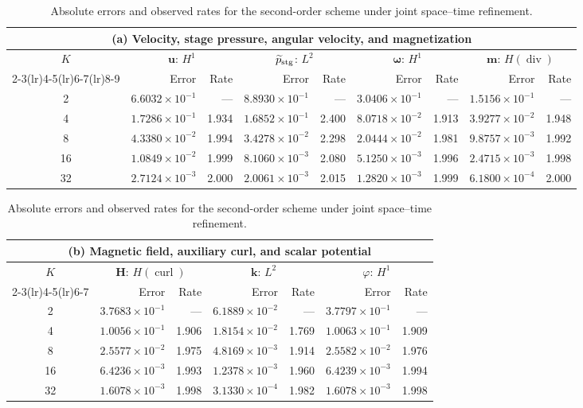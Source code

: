 \documentclass[11pt,a4paper]{article}
\newcommand{\bs}{\boldsymbol}
\DeclareMathOperator{\curl}{curl}
\DeclareMathOperator{\ddiv}{div}
\newcommand{\Div}{\ddiv}
\newcommand{\pp}{\widetilde p}
\theoremstyle{definition}
\numberwithin{equation}{section}
\begin{document}
\begin{table}[H]
\centering
\caption{Absolute errors and observed rates for the second-order scheme under joint space--time refinement.}
\label{tab:second-order-absolute-errors}
\begingroup
\small
\setlength{\tabcolsep}{3.5pt}
\renewcommand{\arraystretch}{1.10}
\begin{tabular}{@{}c*{8}{r}@{}}
\toprule
\multicolumn{9}{c}{(a) Velocity, stage pressure, angular velocity, and magnetization}\\
\midrule
$K$ & \multicolumn{2}{c}{$\bs u$: $H^1$} & \multicolumn{2}{c}{$\pp_{\rm stg}$: $L^2$} & \multicolumn{2}{c}{$\bs\omega$: $H^1$} & \multicolumn{2}{c}{$\bs m$: $H(\Div)$}\\
\cmidrule(lr){2-3}\cmidrule(lr){4-5}\cmidrule(lr){6-7}\cmidrule(lr){8-9}
 & Error & Rate & Error & Rate & Error & Rate & Error & Rate\\
\midrule
2 & $6.6032\!\times\!10^{-1}$ & --- & $8.8930\!\times\!10^{-1}$ & --- & $3.0406\!\times\!10^{-1}$ & --- & $1.5156\!\times\!10^{-1}$ & ---\\
4 & $1.7286\!\times\!10^{-1}$ & 1.934 & $1.6852\!\times\!10^{-1}$ & 2.400 & $8.0718\!\times\!10^{-2}$ & 1.913 & $3.9277\!\times\!10^{-2}$ & 1.948\\
8 & $4.3380\!\times\!10^{-2}$ & 1.994 & $3.4278\!\times\!10^{-2}$ & 2.298 & $2.0444\!\times\!10^{-2}$ & 1.981 & $9.8757\!\times\!10^{-3}$ & 1.992\\
16 & $1.0849\!\times\!10^{-2}$ & 1.999 & $8.1060\!\times\!10^{-3}$ & 2.080 & $5.1250\!\times\!10^{-3}$ & 1.996 & $2.4715\!\times\!10^{-3}$ & 1.998\\
32 & $2.7124\!\times\!10^{-3}$ & 2.000 & $2.0061\!\times\!10^{-3}$ & 2.015 & $1.2820\!\times\!10^{-3}$ & 1.999 & $6.1800\!\times\!10^{-4}$ & 2.000\\
\bottomrule
\end{tabular}
\par\medskip
\begin{tabular}{@{}c*{6}{r}@{}}
\toprule
\multicolumn{7}{c}{(b) Magnetic field, auxiliary curl, and scalar potential}\\
\midrule
$K$ & \multicolumn{2}{c}{$\bs H$: $H(\curl)$} & \multicolumn{2}{c}{$\bs k$: $L^2$} & \multicolumn{2}{c}{$\varphi$: $H^1$}\\
\cmidrule(lr){2-3}\cmidrule(lr){4-5}\cmidrule(lr){6-7}
 & Error & Rate & Error & Rate & Error & Rate\\
\midrule
2 & $3.7683\!\times\!10^{-1}$ & --- & $6.1889\!\times\!10^{-2}$ & --- & $3.7797\!\times\!10^{-1}$ & ---\\
4 & $1.0056\!\times\!10^{-1}$ & 1.906 & $1.8154\!\times\!10^{-2}$ & 1.769 & $1.0063\!\times\!10^{-1}$ & 1.909\\
8 & $2.5577\!\times\!10^{-2}$ & 1.975 & $4.8169\!\times\!10^{-3}$ & 1.914 & $2.5582\!\times\!10^{-2}$ & 1.976\\
16 & $6.4236\!\times\!10^{-3}$ & 1.993 & $1.2378\!\times\!10^{-3}$ & 1.960 & $6.4239\!\times\!10^{-3}$ & 1.994\\
32 & $1.6078\!\times\!10^{-3}$ & 1.998 & $3.1330\!\times\!10^{-4}$ & 1.982 & $1.6078\!\times\!10^{-3}$ & 1.998\\
\bottomrule
\end{tabular}
\endgroup
\end{table}
\end{document}
